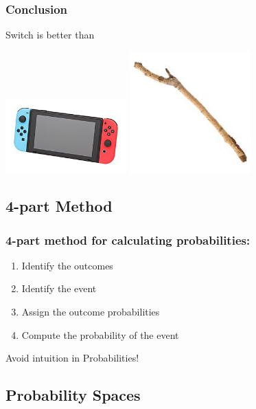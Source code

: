 \documentclass{beamer}
\begin{document}
\begin{frame}
  \frametitle{Conclusion}
  \begin{center}
    {\larger
      \alert{Switch} is better than 

      \bigskip

      \includegraphics[width=0.35\textwidth]{../img/switch}
      \hspace{2cm}
      \includegraphics[width=0.35\textwidth]{../img/stick}
    }
  \end{center}
\end{frame}

\subsection{4-part Method}

\begin{frame}
  \frametitle{4-part method for calculating probabilities:}

  {\large
    \begin{enumerate}
    \item Identify the outcomes 
    \item Identify the event 
    \item Assign the outcome probabilities
    \item Compute the probability of the event 
    \end{enumerate}

    \bigskip

    Avoid intuition in Probabilities!
  }  
\end{frame}

\subsection{Probability Spaces}
\end{document}

